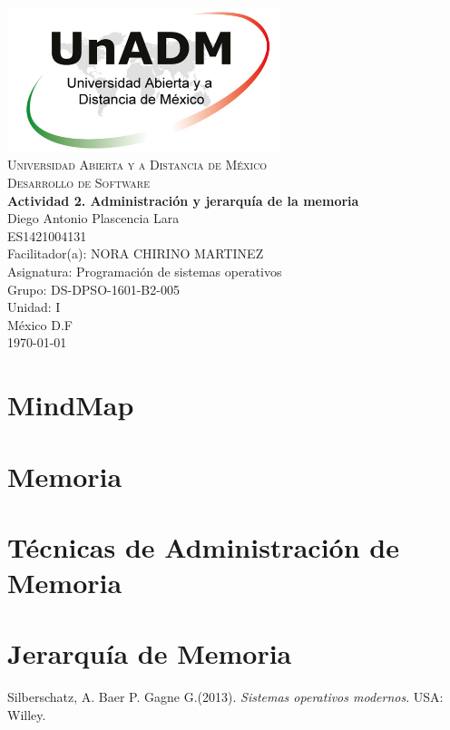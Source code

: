 \documentclass[spanish,12pt,letterpapper]{article}
\begin{document}
	\begin{titlepage}
		\begin{center}
			\includegraphics[width=0.6\textwidth]{../logoUnADM}~\\[1cm] 
			\textsc{Universidad Abierta y a Distancia de México}\\[0.8cm]
			\textsc{Desarrollo de Software}\\[1.8cm]
			
			\textbf{ \Large Actividad 2. Administración y jerarquía de la memoria}\\[3cm]
			
			Diego Antonio Plascencia Lara\\ ES1421004131 \\[0.4cm]
			Facilitador(a): NORA CHIRINO MARTINEZ\\
			Asignatura: Programación de sistemas operativos\\
			Grupo: DS-DPSO-1601-B2-005 \\
			Unidad: I \\
			
			\vfill México D.F\\{\today}
			
		\end{center}
	\end{titlepage}
	
	\section{MindMap}
	\section{Memoria}
	\section{Técnicas de Administración de Memoria}
	\section{Jerarquía de Memoria}	
	
	\pagebreak
	\begin{thebibliography}{9}
		 Silberschatz, A. Baer P. Gagne G.(2013).
		\emph{Sistemas operativos modernos}. USA: Willey.
		
	\end{thebibliography}
	
	
	
	
\end{document}

